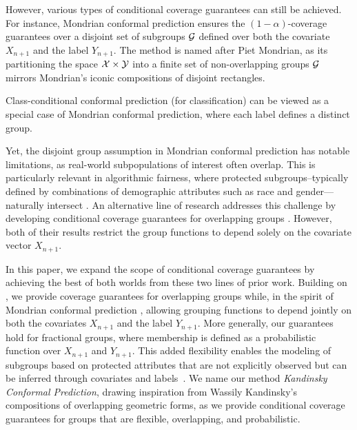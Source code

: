 However, various types of conditional coverage guarantees can still be achieved. For instance, Mondrian conformal prediction \citep{VLNG03} ensures the $(1-\alpha)$-coverage guarantees over a disjoint set of subgroups $\cal G$ defined over both the covariate $X_{n+1}$ and the label $Y_{n+1}$. The method is named after Piet Mondrian, as its partitioning the space $\cal X \times \cal Y$ into a finite set of non-overlapping groups ${\cal G}$ mirrors Mondrian’s iconic compositions of disjoint rectangles. 
\iffalse 
Within each group, the coverage guarantee holds: for every group \( G \in \calG \),
\begin{equation}
    \label{eq:groupcond_guarantee}
    \mathbb P_{(X_{n+1}, Y_{n+1}) \sim \cal D} \left[ Y_{n+1} \in \calC(X_{n+1}) \mid (X_{n+1},Y_{n+1}) \in G\right] = 1-\alpha.
\end{equation}
\fi
Class-conditional conformal prediction (for classification) \citep{LBLJ15, DABJT23} can be viewed as a special case of Mondrian conformal prediction, where each label defines a distinct group.

Yet, the disjoint group assumption in Mondrian conformal prediction has notable limitations, as real-world subpopulations of interest often overlap. This is particularly relevant in algorithmic fairness, where protected subgroups--typically defined by combinations of demographic attributes such as race and gender---naturally intersect \citep{kearns18a,HKRR18}. An alternative line of research addresses this challenge by developing conditional coverage guarantees for overlapping groups \citep{JNRR2023, GCC2023}. However, both of their results restrict the group functions to depend solely on the covariate vector $X_{n+1}$.




In this paper, we expand the scope of conditional coverage guarantees by achieving the best of both worlds from these two lines of prior work. Building on \citet{GCC2023, JNRR2023}, we provide coverage guarantees for overlapping groups while, in the spirit of Mondrian conformal prediction \citep{VLNG03}, allowing grouping functions to depend jointly on both the covariates $X_{n+1}$  and the label  $Y_{n+1}$. More generally, our guarantees hold for fractional groups, where membership is defined as a probabilistic function over  $X_{n+1}$ and  $Y_{n+1}$. This added flexibility enables the modeling of subgroups based on protected attributes that are not explicitly observed but can be inferred through covariates and labels~\citep{RBSC20}. We name our method \emph{Kandinsky Conformal Prediction}, drawing inspiration from Wassily Kandinsky’s compositions of overlapping geometric forms, as we provide conditional coverage guarantees for groups that are flexible, overlapping, and probabilistic.

